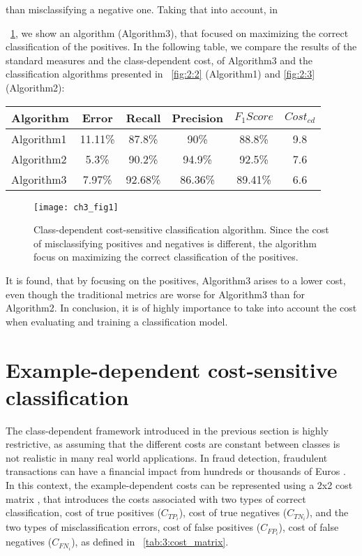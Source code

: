 than misclassifying a negative one. Taking that into account, in \figurename{~\ref{fig:3:1}, we show 
an algorithm (Algorithm3), that focused on maximizing the correct classification of the positives.
In the following table, we compare the results of the standard measures and the class-dependent 
cost, of Algorithm3 and the classification algorithms presented in \figurename{~\ref{fig:2:2}} 
(Algorithm1) and \figurename{ \ref{fig:2:3}} (Algorithm2):
\begin{center}
    \footnotesize
  \begin{tabular}{l|c|c|c|c|c}
  Algorithm & Error & Recall & Precision & $F_1Score$ & $Cost_{cd}$ \\
  \hline
  Algorithm1 & 11.11\% & 87.8\%& 90\%& 88.8\% & 9.8\\ %
  Algorithm2 & 5.3\% & 90.2\%& 94.9\%& 92.5\% & 7.6\\ %
  Algorithm3 & 7.97\%& 92.68\% &86.36\%& 89.41\% & 6.6 \\
  \end{tabular}
\end{center}
\vspace{0.3cm}

\begin{figure}[t!]
  \centering
  \texttt{[image: ch3\_fig1]}
  \caption{Class-dependent cost-sensitive classification algorithm. Since the cost of misclassifying 
positives and negatives is different, the algorithm focus on maximizing the correct classification 
of the positives.}
  \label{fig:3:1}
\end{figure}

It is found, that by focusing on the positives, Algorithm3 arises to a lower cost, even though the 
traditional metrics are worse for Algorithm3 than for Algorithm2. In conclusion, it is of highly 
importance to take into account the cost when evaluating and training a classification model.


\section{Example-dependent cost-sensitive classification}
\label{sec:3:example-dependent}

The class-dependent framework introduced in the previous section is highly restrictive, as 
assuming that the different costs are constant between classes is not realistic in many real world 
applications. In fraud detection, fraudulent transactions  can have a financial impact from 
hundreds or thousands of Euros \citep{Sahin2013}. 
In this context, the example-dependent costs can be represented using a 2x2 cost matrix 
\citep{Elkan2001}, that introduces the costs associated with   two types of correct   
classification, cost of true positives ($C_{TP_i}$), cost of true negatives ($C_{TN_i}$),   and the 
two  types of   misclassification errors, cost of false positives ($C_{FP_i}$), cost of false 
negatives   ($C_{FN_i}$), as   defined in \tablename{~\ref{tab:3:cost_matrix}}.

}
